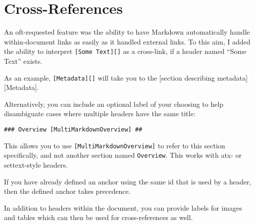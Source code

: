 
\def\mytitle{Cross-References}
\def\myauthor{Fletcher T. Penney}
\def\revised{2018-06-30}




\tableofcontents

\section{Cross-References }
\label{cross-references}

An oft-requested feature was the ability to have Markdown automatically handle
within-document links as easily as it handled external links. To this aim, I
added the ability to interpret \texttt{[Some Text][]} as a cross-link, if a header
named ``Some Text'' exists.

As an example, \texttt{[Metadata][]} will take you to the
{[section describing metadata]}{[Metadata]}.

Alternatively, you can include an optional label of your choosing to help
disambiguate cases where multiple headers have the same title:

\begin{verbatim}
### Overview [MultiMarkdownOverview] ##
\end{verbatim}

This allows you to use \texttt{[MultiMarkdownOverview]} to refer to this section
specifically, and not another section named \texttt{Overview}. This works with atx-
or settext-style headers.

If you have already defined an anchor using the same id that is used by a
header, then the defined anchor takes precedence.

In addition to headers within the document, you can provide labels for images
and tables which can then be used for cross-references as well.



